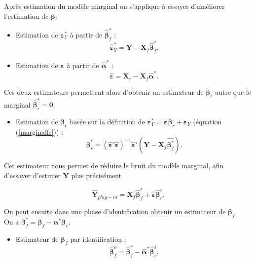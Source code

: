 \documentclass[12pt,a4paper]{report}
\begin{document}
Après estimation du modèle marginal on s'applique à essayer d'améliorer l'estimation de $\boldsymbol{\beta}$: 
\begin{itemize}
	\item Estimation de  $\boldsymbol{\varepsilon}_Y^*$ à partir de $\hat{\boldsymbol{\beta}}^*_f$ :
	\begin{equation}
		\hat{\boldsymbol{\varepsilon}}_Y^*=\boldsymbol{Y}-\boldsymbol{X}_f\hat{\boldsymbol{\beta}}^*_f. \nonumber 
	\end{equation}
	\item Estimation de $\boldsymbol{\varepsilon}$ à partir de $\hat{\boldsymbol{\alpha}}^*$ :
	\begin{equation}
		\hat{\boldsymbol{\varepsilon}}=\boldsymbol{X}_r-\boldsymbol{X}_f\hat{\boldsymbol{\alpha}}^* .\label{epsilonchapeaufr}
	\end{equation}
\end{itemize}
Ces deux estimateurs permettent alors d'obtenir un estimateur de $\boldsymbol{\beta}_r$ autre que le marginal $\hat{\boldsymbol{\beta}}^*_r=\boldsymbol{0}$.
\begin{itemize}
	\item Estimation de $\boldsymbol{\beta}_r$ basée sur la définition de $\boldsymbol{\varepsilon}_Y^*=\boldsymbol{\varepsilon}\boldsymbol{\beta}_r+\boldsymbol{\varepsilon}_Y$ (équation (\ref{marginalfr})) :
	\begin{equation}
		\hat{\boldsymbol{\beta}}_r^{\varepsilon}=(\hat{\boldsymbol{\varepsilon}}'\hat{\boldsymbol{\varepsilon}})^{-1}\hat{\boldsymbol{\varepsilon}}'(\boldsymbol{Y}- \boldsymbol{X}_f\hat{\boldsymbol{\beta}^*_f}). \nonumber 
	\end{equation}
\end{itemize}
Cet estimateur nous permet de réduire le bruit du modèle marginal, afin d'essayer d'estimer  $\boldsymbol{Y} $ plus précisément

\begin{equation}
	\hat{\boldsymbol{Y}}_{plug-in}=\boldsymbol{X}_f\hat{\boldsymbol{\beta}}^*_f + \hat{\boldsymbol{\varepsilon}}\hat{\boldsymbol{\beta}}_{r}^{\varepsilon}. \nonumber 
\end{equation}

		On peut ensuite dans une phase d'identification obtenir un estimateur de $\boldsymbol{\beta}_f$.\\On a $\boldsymbol{\beta}^*_f=\boldsymbol{\beta}_f+\boldsymbol{\alpha}^*\boldsymbol{\beta}_r $.
		\begin{itemize}
			\item Estimateur de $\boldsymbol{\beta}_f $ par identification :
			\begin{equation}
			\hat{\boldsymbol{\beta}}_f^{\varepsilon}=\hat{\boldsymbol{\beta}}^*_f-\hat{\boldsymbol{\alpha}}^*\hat{\boldsymbol{\beta}}_{r}^{\varepsilon}. \nonumber 
			\end{equation}
		\end{itemize}
	
\end{document}

